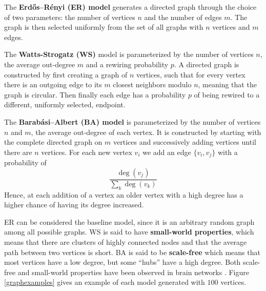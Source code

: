 \begin{definition}
The \textbf{Erdős–Rényi (ER) model} generates a directed graph through the choice of two parameters: the number of vertices $n$ and the number of edges $m$. The graph is then selected uniformly from the set of all graphs with $n$ vertices and $m$ edges.
\end{definition}

\begin{definition}
The \textbf{Watts-Strogatz (WS)} model is parameterized by the number of vertices $n$, the average out-degree $m$ and a rewiring probability $p$. A directed graph is constructed by first creating a graph of $n$ vertices, such that for every vertex there is an outgoing edge to its $m$ closest neighbors modulo $n$, meaning that the graph is circular. Then finally each edge has a probability $p$ of being rewired to a different, uniformly selected, endpoint.
\end{definition}

\begin{definition}
  The \textbf{Barabási–Albert (BA) model} is parameterized by the number of vertices $n$ and $m$, the average out-degree of each vertex. It is constructed by starting with the complete directed graph on $m$ vertices and successively adding vertices until there are $n$ vertices. For each new vertex $v_{i}$ we add an edge $\{v_{i},v_{j}\}$  with a probability of
  \[
    \frac{\deg(v_{j})}{\sum_{k} \deg(v_{k})}
  \]
  Hence, at each addition of a vertex an older vertex with a high degree has a higher chance of having its degree increased.
\end{definition}
ER can be considered the baseline model, since it is an arbitrary random graph among all possible graphs. WS is said to have \textbf{small-world properties}, which means that there are clusters of highly connected nodes and that the average path between two vertices is short. BA is said to be \textbf{scale-free} which means that most vertices have a low degree, but some ``hubs'' have a high degree. Both scale-free and small-world properties have been observed in brain networks \cite{SPORNS2004418}. Figure \ref{graphexamples} gives an example of each model generated with $100$ vertices.

